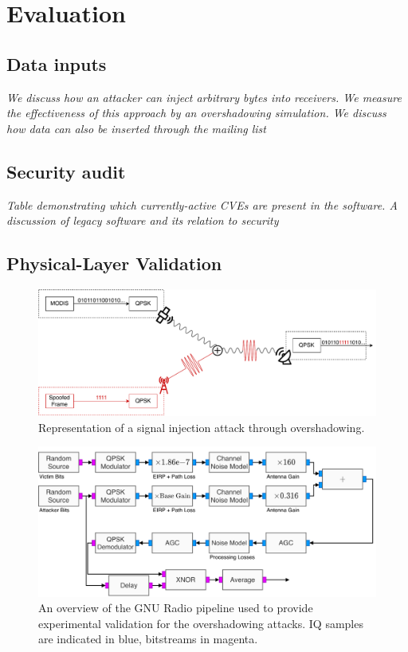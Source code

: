 \section{Evaluation}\label{sec:evaluation}

\subsection{Data inputs}

\textit{We discuss how an attacker can inject arbitrary bytes into receivers.  We measure the effectiveness of this approach by an overshadowing simulation.  We discuss how data can also be inserted through the mailing list}

\subsection{Security audit}
\textit{Table demonstrating which currently-active CVEs are present in the software. A discussion of legacy software and its relation to security}

\subsection{Physical-Layer Validation}

\begin{figure}
    \centering
    \includegraphics[width=\columnwidth]{diagrams/overshadowing_demo.pdf}
    \caption{Representation of a signal injection attack through overshadowing.}
    \label{fig:overshadowing_demo}
\end{figure}

\begin{figure}
    \centering
    \includegraphics[width=\columnwidth]{diagrams/overshadowing_pipeline.pdf}
    \caption{An overview of the GNU Radio pipeline used to provide experimental validation for the overshadowing attacks. IQ samples are indicated in blue, bitstreams in magenta.}
    \label{fig:overshadowing_pipeline}
\end{figure}

